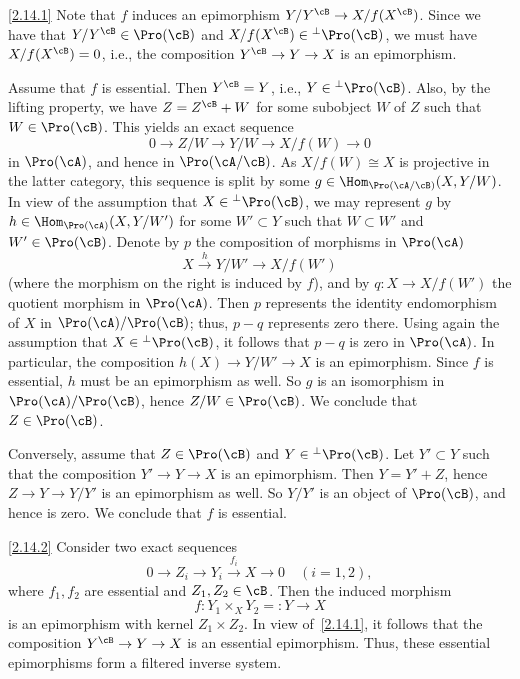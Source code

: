 \begin{proofc}
\begin{step}{\eqref{2.14.1}}%
Note that $f$ induces an epimorphism $Y/Y^{\cB} \to X/f(X^{\cB})$. Since we have that $Y/Y^{\cB} \in \Pro(\cB)$ and $X/f(X^{\cB})\in {^{\perp} \Pro(\cB)}$, we must have $X/f(X^{\cB}) = 0$, i.e., the composition $Y^{\cB} \to Y \to X$ is an epimorphism.

Assume that $f$ is essential. Then $Y^{\cB} = Y$, i.e., $Y \in {^{\perp} \Pro(\cB)}$. Also, by the lifting property, we have $Z = Z^{\cB} + W$ for some subobject $W$ of $Z$ such that $W \in \Pro(\cB)$. This yields an exact sequence
\[
0 \longrightarrow Z/W \longrightarrow Y/W
\longrightarrow X/f(W) \longrightarrow 0
\]
in $\Pro(\cA)$, and hence in $\Pro(\cA/\cB)$. As $X/f(W) \cong X$ is projective in the latter category, this sequence is split by some $g \in \Hom_{\Pro(\cA/\cB)}(X,Y/W)$. In view of the assumption that $X \in {^{\perp} \Pro(\cB)}$, we may represent $g$ by $h \in \Hom_{\Pro(\cA)}(X,Y/W')$ for some $W' \subset Y$ such that $W \subset W'$ and $W' \in \Pro(\cB)$. Denote by $p$ the composition of morphisms in $\Pro(\cA)$
\[
X \stackrel{h}{\longrightarrow} Y/W' \longrightarrow X/f(W')
\]
(where the morphism on the right is induced by $f$), and by $q : X \to X/f(W')$ the quotient morphism in $\Pro(\cA)$. Then $p$ represents the identity endomorphism of $X$ in $\Pro(\cA)/\Pro(\cB)$; thus, $p - q$ represents zero there. Using again the assumption that $X \in {^{\perp} \Pro(\cB)}$, it follows that $p - q$ is zero in $\Pro(\cA)$. In particular, the composition $h(X) \to Y/W' \to X$ is an epimorphism. Since $f$ is essential, $h$ must be an epimorphism as well. So $g$ is an isomorphism in $\Pro(\cA)/\Pro(\cB)$, hence $Z/W \in \Pro(\cB)$. We conclude that $Z \in \Pro(\cB)$.

Conversely, assume that $Z \in \Pro(\cB)$ and $Y \in {^{\perp} \Pro(\cB)}$. Let $Y' \subset Y$ such that the composition $Y' \to Y \to X$ is an epimorphism. Then $Y = Y' + Z$, hence $Z \to Y \to Y/Y'$ is an epimorphism as well. So $Y/Y'$ is an object of $\Pro(\cB)$, and hence is zero. We conclude that $f$ is essential.
\end{step}

\begin{laststep}{\eqref{2.14.2}}%
Consider two exact sequences
\[
0 \longrightarrow Z_i \longrightarrow Y_i
\stackrel{f_i}{\longrightarrow} X \longrightarrow 0 \quad (i = 1,2),
\]
where $f_1,f_2$ are essential and $Z_1,Z_2 \in \cB$. Then the induced morphism
\[
f : Y_1 \times_X Y_2 =: Y \longrightarrow X
\]
is an epimorphism with kernel $Z_1 \times Z_2$. In view of~\eqref{2.14.1}, it follows that the composition $Y^{\cB} \to Y \to X$ is an essential epimorphism. Thus, these essential epimorphisms form a filtered inverse system.


\end{laststep}
\end{proofc}
